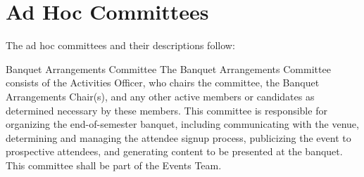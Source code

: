 \section{Ad Hoc Committees}\label{sec:AdHocCommittees} The ad hoc committees and their descriptions follow:\\
\begin{enumsubsection}
\item{Banquet Arrangements Committee} The Banquet Arrangements Committee consists of the Activities Officer, who chairs the committee, the Banquet Arrangements Chair(s), and any other active members or candidates as determined necessary by these members. This committee is responsible for organizing the end-of-semester banquet, including communicating with the venue, determining and managing the attendee signup process, publicizing the event to prospective attendees, and generating content to be presented at the banquet. This committee shall be part of the Events Team. %







\end{enumsubsection}
